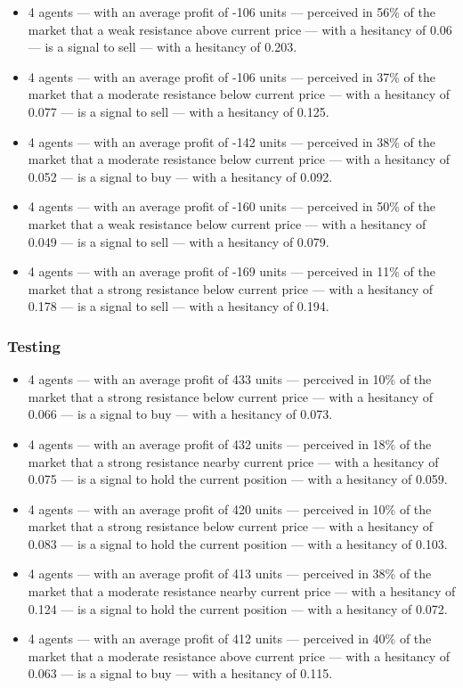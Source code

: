 {\small
  \begin{itemize}
  \item 4 agents — with an average profit of -106 units — perceived in 56\% of
    the market that a weak resistance above current price — with a hesitancy of
    0.06 — is a signal to sell — with a hesitancy of 0.203.
  \item 4 agents — with an average profit of -106 units — perceived in 37\% of
    the market that a moderate resistance below current price — with a hesitancy
    of 0.077 — is a signal to sell — with a hesitancy of 0.125.
  \item 4 agents — with an average profit of -142 units — perceived in 38\% of
    the market that a moderate resistance below current price — with a hesitancy
    of 0.052 — is a signal to buy — with a hesitancy of 0.092.
  \item 4 agents — with an average profit of -160 units — perceived in 50\% of
    the market that a weak resistance below current price — with a hesitancy of
    0.049 — is a signal to sell — with a hesitancy of 0.079.
  \item 4 agents — with an average profit of -169 units — perceived in 11\% of
    the market that a strong resistance below current price — with a hesitancy
    of 0.178 — is a signal to sell — with a hesitancy of 0.194.
  \end{itemize}
}

\subsubsection{Testing}
\label{}

{\small
  \begin{itemize}
  \item 4 agents — with an average profit of 433 units — perceived in 10\% of
    the market that a strong resistance below current price — with a hesitancy
    of 0.066 — is a signal to buy — with a hesitancy of 0.073.
  \item 4 agents — with an average profit of 432 units — perceived in 18\% of
    the market that a strong resistance nearby current price — with a hesitancy
    of 0.075 — is a signal to hold the current position — with a hesitancy of
    0.059.
  \item 4 agents — with an average profit of 420 units — perceived in 10\% of
    the market that a strong resistance below current price — with a hesitancy
    of 0.083 — is a signal to hold the current position — with a hesitancy of
    0.103.
  \item 4 agents — with an average profit of 413 units — perceived in 38\% of
    the market that a moderate resistance nearby current price — with a
    hesitancy of 0.124 — is a signal to hold the current position — with a
    hesitancy of 0.072.
  \item 4 agents — with an average profit of 412 units — perceived in 40\% of
    the market that a moderate resistance above current price — with a hesitancy
    of 0.063 — is a signal to buy — with a hesitancy of 0.115.
  \end{itemize}
}
